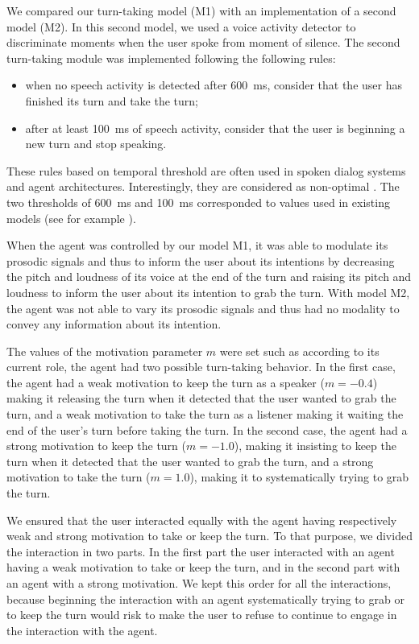 
We compared our turn-taking model (M1) with an implementation of a second model (M2). 
In this second model, we used a voice activity detector to discriminate moments when the user spoke from moment of silence. 
The second turn-taking module was implemented following the following rules: 
\begin{itemize}
\item when no speech activity is detected after 600~ms, consider that the user has finished its turn and take the turn;
\item after at least 100~ms of speech activity, consider that the user is beginning a new turn and stop speaking. 
\end{itemize} 
These rules based on temporal threshold are often used in spoken dialog systems and agent architectures. 
Interestingly, they are considered as non-optimal \citep{ward_root_2005}. 
The two thresholds of 600~ms and 100~ms corresponded to values used in existing models (see for example \citep{ferrer_is_2002}). 

When the agent was controlled by our model M1, it was able to modulate its prosodic signals and thus to inform the user about its intentions by decreasing the pitch and loudness of its voice at the end of the turn and raising its pitch and loudness to inform the user about its intention to grab the turn.  
With model M2, the agent was not able to vary its prosodic signals and thus had no modality to convey any information about its intention. 

The values of the motivation parameter $m$ were set such as according to its current role, the agent had two possible turn-taking behavior. In the first case, the agent had a weak motivation to keep the turn as a speaker ($m=-0.4$) making it releasing the turn when it detected that the user wanted to grab the turn, and a weak motivation to take the turn as a listener making it waiting the end of the user's turn before taking the turn. In the second case, the agent had a strong motivation to keep the turn ($m=-1.0$), making it insisting to keep the turn when it detected that the user wanted to grab the turn, and a strong motivation to take the turn ($m=1.0$), making it to systematically trying to grab the turn. 

We ensured that the user interacted equally with the agent having respectively weak and strong motivation to take or keep the turn. To that purpose, we divided the interaction in two parts. In the first part the user interacted with an agent having a weak motivation to take or keep the turn, and in the second part with an agent with a strong motivation.
We kept this order for all the interactions, because beginning the interaction with an agent systematically trying to grab or to keep the turn would risk to make the user to refuse to continue to engage in the interaction with the agent. 

